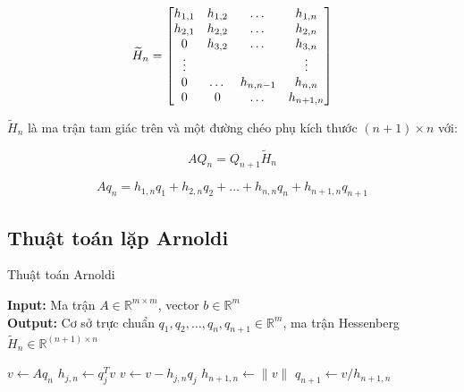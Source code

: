 \documentclass[14pt, a4paper]{article}
\numberwithin{equation}{section}
\numberwithin{algorithm}{section}
\numberwithin{figure}{section}
\numberwithin{dl}{section}
\numberwithin{md}{section}
\numberwithin{bd}{section}
\numberwithin{dn}{section}
\begin{document}
\begin{equation} \label{eq:Hessenberg_matrix}
    \widetilde{H}_n = \begin{bmatrix} h_{1,1} & h_{1, 2} & \dots & h_{1, n} \\
    h_{2, 1} & h_{2, 2} & \dots & h_{2, n} \\
    0 & h_{3, 2} & \dots  & h_{3, n} \\
    \vdots & \space & \space & \vdots \\
    0 & \dots & h_{n, n-1} & h_{n, n} \\
    0 & 0 & \dots & h_{n+1, n}\end{bmatrix}
\end{equation}

$\widetilde{H}_n$ là ma trận tam giác trên và một đường chéo phụ kích thước $(n+1)\times n$ với:

\begin{equation} \label{eq:A_projection}
    AQ_n = Q_{n+1}\widetilde{H}_n
\end{equation}

\begin{equation} \label{eq:recurrence_term}
    Aq_n = h_{1, n}q_1 + h_{2, n}q_2 + \dots + h_{n, n}q_n + h_{n+1, n}q_{n+1}
\end{equation}


\subsection{Thuật toán lặp Arnoldi}


\begin{algorithm}
    \caption{Thuật toán Arnoldi}\label{alg:Arnoldi}
    \hspace*{\algorithmicindent} \textbf{Input:} {Ma trận $A \in \mathbb{R}^{m \times m}$, vector $b \in \mathbb{R}^m$} \\
    \hspace*{\algorithmicindent} \textbf{Output:} {Cơ sở trực chuẩn $q_1, q_2, \dots, q_n, q_{n+1} \in \mathbb{R}^m$, ma trận Hessenberg $\widetilde{H}_n \in \mathbb{R}^{(n+1) \times n}$}
    \begin{algorithmic}
            \State $v \leftarrow Aq_n$
                \State $h_{j,n} \leftarrow q_j^T v$
                \State $v \leftarrow v - h_{j,n}q_j$
            \EndFor
            \State $h_{n+1,n} \leftarrow \lVert v \rVert$
            \State $q_{n+1} \leftarrow v/h_{n+1,n}$
        \EndFor
    \end{algorithmic}
\end{algorithm}
\end{document}
